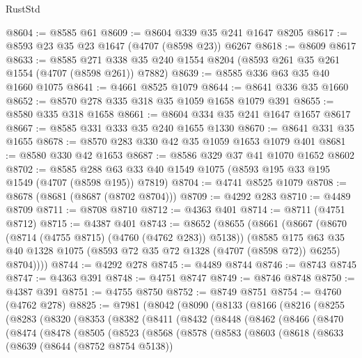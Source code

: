 \begin{lexlean}{RustStd}
\begin{coremodule}
@8604 := @8585 @61
@8609 := @8604 @339 @35 @241 @1647 @8205
@8617 := @8593 @23 @35 @23 @1647 (@4707 (@8598 @23)) @6267
@8618 := @8609 @8617
@8633 := @8585 @271 @338 @35 @240 @1554 @8204 (@8593 @261 @35 @261 @1554 (@4707 (@8598 @261)) @7882)
@8639 := @8585 @336 @63 @35 @40 @1660 @1075
@8641 := @4661 @8525 @1079
@8644 := @8641 @336 @35 @1660
@8652 := @8570 @278 @335 @318 @35 @1059 @1658 @1079 @391
@8655 := @8580 @335 @318 @1658
@8661 := @8604 @334 @35 @241 @1647 @1657 @8617
@8667 := @8585 @331 @333 @35 @240 @1655 @1330
@8670 := @8641 @331 @35 @1655
@8678 := @8570 @283 @330 @42 @35 @1059 @1653 @1079 @401
@8681 := @8580 @330 @42 @1653
@8687 := @8586 @329 @37 @41 @1070 @1652 @8602
@8702 := @8585 @288 @63 @33 @40 @1549 @1075 (@8593 @195 @33 @195 @1549 (@4707 (@8598 @195)) @7819)
@8704 := @4741 @8525 @1079
@8708 := @8678 (@8681 (@8687 (@8702 @8704)))
@8709 := @4292 @283
@8710 := @4489 @8709
@8711 := @8708 @8710
@8712 := @4363 @401
@8714 := @8711 (@4751 @8712)
@8715 := @4387 @401
@8743 := @8652
    (@8655
      (@8661
        (@8667
          (@8670 (@8714 (@4755 @8715) (@4760 (@4762 @283)) @5138))
          (@8585
            @175
            @63
            @35
            @40
            @1328
            @1075
            (@8593 @72 @35 @72 @1328 (@4707 (@8598 @72)) @6255)
            @8704))))
@8744 := @4292 @278
@8745 := @4489 @8744
@8746 := @8743 @8745
@8747 := @4363 @391
@8748 := @4751 @8747
@8749 := @8746 @8748
@8750 := @4387 @391
@8751 := @4755 @8750
@8752 := @8749 @8751
@8754 := @4760 (@4762 @278)
@8825 := @7981
    (@8042
      (@8090
        (@8133
          (@8166
            (@8216
              (@8255
                (@8283
                  (@8320
                    (@8353
                      (@8382
                        (@8411
                          (@8432
                            (@8448
                              (@8462
                                (@8466
                                  (@8470
                                    (@8474
                                      (@8478
                                        (@8505
                                          (@8523
                                            (@8568
                                              (@8578
                                                (@8583
                                                  (@8603
                                                    (@8618
                                                      (@8633
                                                        (@8639
                                                          (@8644 (@8752 @8754 @5138))

\end{coremodule}
\end{lexlean}

